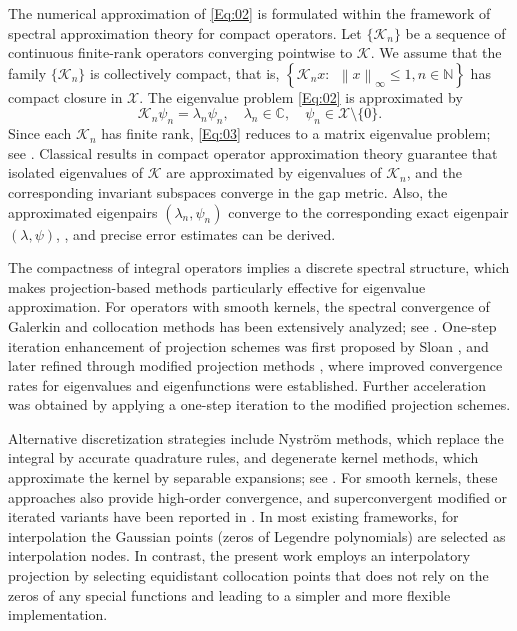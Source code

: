 \documentclass[]{interact}
\theoremstyle{plain}%
\theoremstyle{definition}
\theoremstyle{remark}
\newcommand{\norm}[1]{\left\lVert #1\right\rVert}
\begin{document}
The numerical approximation of \eqref{Eq:02} is formulated within the framework of spectral approximation theory for compact operators. Let $\{\mathcal{K}_n\}$ be a sequence of continuous finite-rank operators converging pointwise to $\mathcal{K}$. We assume that the family $\{\mathcal{K}_n\}$ is collectively compact, that is,
$
\left\{
\mathcal{K}_n x 
:\ 
\ \norm{x}_\infty \le 1, n \in \mathbb{N}
\right\}
$
has compact closure in $\mathcal{X}$.  
The eigenvalue problem \eqref{Eq:02} is approximated by  
\begin{equation} \label{Eq:03}
	\mathcal{K}_n \psi_n = \lambda_n \psi_n,
	\quad 
	\lambda_n \in \mathbb{C},
	\quad 
	\psi_n \in \mathcal{X}\setminus\{0\}.
\end{equation}
Since each $\mathcal{K}_n$ has finite rank, \eqref{Eq:03} reduces to a matrix eigenvalue problem; see \cite{Ahues, KEA0}. Classical results in compact operator approximation theory guarantee that isolated eigenvalues of $\mathcal{K}$ are approximated by eigenvalues of $\mathcal{K}_n$, and the corresponding invariant subspaces converge in the gap metric. Also, the approximated eigenpairs $(\lambda_n, \psi_n)$ converge to the corresponding exact eigenpair $(\lambda, \psi)$, , and precise error estimates can be derived.

The compactness of integral operators implies a discrete spectral structure, which makes projection-based methods particularly effective for eigenvalue approximation. 
For operators with smooth kernels, the spectral convergence of Galerkin and collocation methods has been extensively analyzed; see \cite{Ahues, KEA0, Baker0, Chatelin, Sloan0}. 
One-step iteration enhancement of projection schemes was first proposed by Sloan \cite{Sloan1}, and later refined through modified projection methods \cite{RPK5, RPK6}, where improved convergence rates for eigenvalues and eigenfunctions were established. 
Further acceleration was obtained by applying a one-step iteration to the modified projection schemes.

Alternative discretization strategies include Nystr\"om methods, which replace the integral by accurate quadrature rules, and degenerate kernel methods, which approximate the kernel by separable expansions; see \cite{Gnan1}. For smooth kernels, these approaches also provide high-order convergence, and superconvergent modified or iterated variants have been reported in \cite{CA-PS-DS-MT}. In most existing frameworks, for interpolation the Gaussian points (zeros of Legendre polynomials) are selected as interpolation nodes. In contrast, the present work employs an interpolatory projection by selecting equidistant collocation points that does not rely on the zeros of any special functions and leading to a simpler and more flexible implementation.
\end{document}
